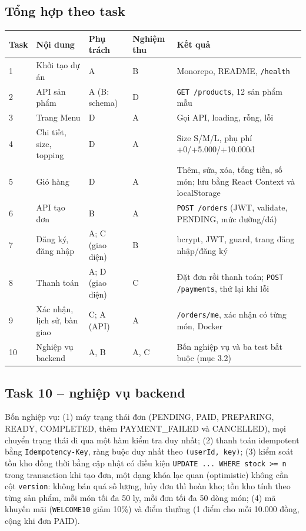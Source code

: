 \documentclass[a4paper]{article}
\begin{document}
\subsection{Tổng hợp theo task}
\begin{center}
\small\everymath{}\raggedright
\begin{tabular}{@{}p{0.8cm}p{3.0cm}p{3.0cm}p{1.7cm}p{4.5cm}@{}}
\toprule
\textbf{Task} & \textbf{Nội dung} & \textbf{Phụ trách} & \textbf{Nghiệm thu} & \textbf{Kết quả} \\ \midrule
1 & Khởi tạo dự án & A & B & Monorepo, README, \texttt{/health} \\
2 & API sản phẩm & A (B: schema) & D & \texttt{GET /products}, 12 sản phẩm mẫu \\
3 & Trang Menu & D & A & Gọi API, loading, rỗng, lỗi \\
4 & Chi tiết, size, topping & D & A & Size S/M/L, phụ phí +0/+5.000/+10.000đ \\
5 & Giỏ hàng & D & A & Thêm, sửa, xóa, tổng tiền, số món; lưu bằng React Context và localStorage \\
6 & API tạo đơn & B & A & \texttt{POST /orders} (JWT, validate, PENDING, mức đường/đá) \\
7 & Đăng ký, đăng nhập & A; C (giao diện) & B & bcrypt, JWT, guard, trang đăng nhập/đăng ký \\
8 & Thanh toán & A; D (giao diện) & C & Đặt đơn rồi thanh toán; \texttt{POST /payments}, thử lại khi lỗi \\
9 & Xác nhận, lịch sử, bàn giao & C; A (API) & A & \texttt{/orders/me}, xác nhận có từng món, Docker \\
10 & Nghiệp vụ backend & A, B & A, C & Bốn nghiệp vụ và ba test bắt buộc (mục 3.2) \\
\bottomrule
\end{tabular}
\end{center}

\subsection{Task 10 -- nghiệp vụ backend}
Bốn nghiệp vụ: (1) máy trạng thái đơn (PENDING, PAID, PREPARING, READY, COMPLETED, thêm PAYMENT\_FAILED và CANCELLED), mọi chuyển trạng thái đi qua một hàm kiểm tra duy nhất; (2) thanh toán idempotent bằng \texttt{Idempotency-Key}, ràng buộc duy nhất theo \texttt{(userId, key)}; (3) kiểm soát tồn kho đồng thời bằng cập nhật có điều kiện \texttt{UPDATE ... WHERE stock >= n} trong transaction khi tạo đơn, một dạng khóa lạc quan (optimistic) không cần cột \texttt{version}: không bán quá số lượng, hủy đơn thì hoàn kho; tồn kho tính theo từng sản phẩm, mỗi món tối đa 50 ly, mỗi đơn tối đa 50 dòng món; (4) mã khuyến mãi (\texttt{WELCOME10} giảm 10\%) và điểm thưởng (1 điểm cho mỗi 10.000 đồng, cộng khi đơn PAID).
\end{document}
